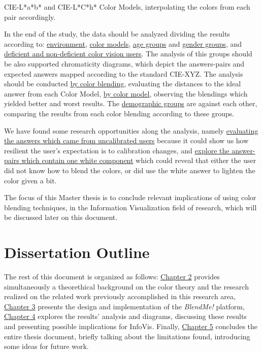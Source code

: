CIE-L*a*b* and CIE-L*C*h* Color Models, interpolating the colors from each pair accordingly. \par
%
In the end of the study, the data should be analyzed dividing the results according to: \ul{environment}, \ul{color
models}, \ul{age groups} and \ul{gender groups}, and \ul{deficient and non-deficient color vision users}. The analysis
of this groups should be also supported chromaticity diagrams, which depict the answers-pairs and expected answers
mapped according to the standard CIE-XYZ. The analysis should be conducted \ul{by color blending}, evaluating the distances
to the ideal answer from each Color Model, \ul{by color model}, observing the blendings which yielded better and worst
results. The \ul{demographic groups} are against each other, comparing the results from each color blending according
to these groups. \par
%
We have found some research opportunities along the analysis, namely \ul{evaluating the answers which came from
uncalibrated users} because it could show us how resilient the user's expectation is to calibration changes, and \ul{explore
the answer-pairs which contain one white component} which could reveal that either the user did not know how to blend
the colors, or did use the white answer to lighten the color given a bit. \par
%
The focus of this Master thesis is to conclude relevant implications of using color blending techniques, in the Information
Visualization field of research, which will be discussed later on this document.
%
\section{Dissertation Outline}
%
The rest of this document is organized as follows: \ul{Chapter 2} provides simultaneously a theorethical background on the
color theory and the research realized on the related work previously accomplished in this research area, \ul{Chapter 3}
presents the design and implementation of the \emph{BlendMe!} platform, \ul{Chapter 4} explores the results' analysis and
diagrams, discussing these results and presenting possible implications for InfoVis. Finally, \ul{Chapter 5} concludes the
entire thesis document, briefly talking about the limitations found, introducing some ideas for future work.
%
